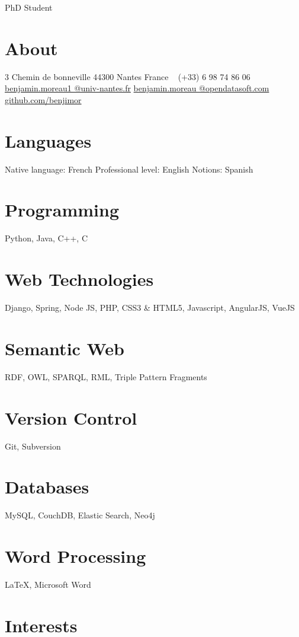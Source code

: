 \documentclass[]{friggeri-cv}
\begin{document}
       {PhD Student}


\begin{aside}
  \section{About}
    3 Chemin de bonneville
    44300 Nantes
    France
    ~
    (+33) 6 98 74 86 06
    \href{mailto:benjamin.moreau1@univ-nantes.fr}{benjamin.moreau1
    @univ-nantes.fr}
    \href{mailto:benjamin.moreau@opendatasoft.com}{benjamin.moreau
    @opendatasoft.com}
    \href{https://github.com/benjimor}{github.com/benjimor}
  \section{Languages}
    Native language: French
    Professional level: English
    Notions: Spanish
  \section{Programming}
  	Python, Java, C++, C
  \section{Web Technologies}
 	Django, Spring, Node JS, 
 	PHP, CSS3 \& HTML5,
 	Javascript,
 	AngularJS, VueJS
  \section{Semantic Web}
  	RDF, OWL, SPARQL, RML,
  	Triple Pattern Fragments
  \section{Version Control}
  	Git, Subversion
  \section{Databases}
  	MySQL, CouchDB,
  	Elastic Search, Neo4j
  \section{Word Processing}
  	\LaTeX, Microsoft Word
\end{aside}

\section{Interests}
\end{document}
